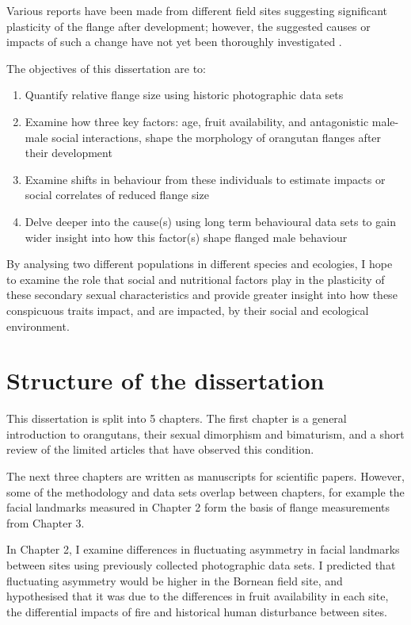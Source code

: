 Various reports have been made from different field sites suggesting significant plasticity of the flange after development; however, the suggested causes or impacts of such a change have not yet been thoroughly investigated \citep{Galdikas.1978cv,Galdikas.1985, Knott.2009}.


The objectives of this dissertation are to:
\begin{enumerate}
    \item Quantify relative flange size using historic photographic data sets
    \item Examine how three key factors: age, fruit availability, and antagonistic male-male social interactions, shape the morphology of orangutan flanges after their development
    \item Examine shifts in behaviour from these individuals to estimate impacts or social correlates of reduced flange size
    \item Delve deeper into the cause(s) using long term behavioural data sets to gain wider insight into how this factor(s) shape flanged male behaviour
\end{enumerate}

By analysing two different populations in different species and ecologies, I hope to examine the role that social and nutritional factors play in the plasticity of these secondary sexual characteristics and provide greater insight into how these conspicuous traits impact, and are impacted, by their social and ecological environment.

\section{Structure of the dissertation}
This dissertation is split into 5 chapters. The first chapter is a general introduction to orangutans, their sexual dimorphism and bimaturism, and a short review of the limited articles that have observed this condition. 

The next three chapters are written as manuscripts for scientific papers. However, some of the methodology and data sets overlap between chapters, for example the facial landmarks measured in Chapter 2 form the basis of flange measurements from Chapter 3. 

In Chapter 2, I examine differences in fluctuating asymmetry in facial landmarks between sites using previously collected photographic data sets. I predicted that fluctuating asymmetry would be higher in the Bornean field site, and hypothesised that it was due to the differences in fruit availability in each site, the differential impacts of fire and historical human disturbance between sites.

